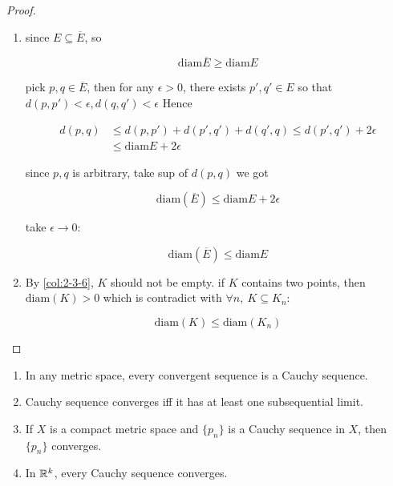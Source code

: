 \begin{proof}
    \begin{enumerate}
        \item since $E \subseteq \overline{E}$, so

        \[
            \mathrm{diam} \overline{E} \ge \mathrm{diam} E
        \]

        pick $p,q \in \overline{E}$, then for any $\epsilon > 0$, there exists 
        $p',q' \in E$ so that $d(p,p') < \epsilon, d(q,q') < \epsilon$ Hence

        \begin{align*}
            d(p,q) &\le d(p,p') + d(p',q') + d(q',q) \le d(p',q') + 2\epsilon \\
            & \le \mathrm{diam} E + 2\epsilon
        \end{align*}

        since $p, q$ is arbitrary, take sup of $d(p,q)$ we got

        \[
            \mathrm{diam}(\overline{E}) \le \mathrm{diam} E + 2\epsilon
        \]

        take $\epsilon \to 0$:

        \[
            \mathrm{diam}(\overline{E}) \le \mathrm{diam} E
        \]

        \item By \autoref{col:2-3-6}, $K$ should not be empty. if $K$ contains two points, then $\mathrm{diam}(K) > 0$
        which is contradict with $\forall n,\: K \subseteq K_n $:

        \[
            \mathrm{diam}(K) \le \mathrm{diam}(K_n)
        \]
    \end{enumerate}
\end{proof}

\begin{thm}
    \begin{enumerate}
        \item In any metric space, every convergent sequence is a Cauchy sequence.

        \item Cauchy sequence converges iff it has at least one subsequential limit.
        
        \item If $X$ is a compact metric space and $\{ p_n \}$ is a Cauchy sequence in $X$, then $\{ p_n \}$ converges.

        \item In $\mathbb{R}^k$, every Cauchy sequence converges.
    \end{enumerate}
\end{thm}

